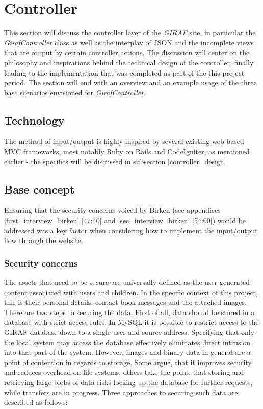 \section{Controller}
\label{controller}
This section will discuss the controller layer of the \emph{GIRAF} site, in particular the \emph{GirafController} class as well as the interplay of JSON and the incomplete views that are output by certain controller actions. The discussion will center on the philosophy and inspirations behind the technical design of the controller, finally leading to the implementation that was completed as part of the this project period. The section will end with an overview and an example usage of the three base scenarios envisioned for \emph{GirafController}.

\subsection{Technology}
The method of input/output is highly inspired by several existing web-based MVC frameworks, most notably Ruby on Rails and CodeIgniter, as mentioned earlier - the specifics will be discussed in subsection \vref{controller_design}.

\subsection{Base concept}
Ensuring that the security concerns voiced by Birken (see appendices \vref{first_interview_birken} [47:40] and \vref{sec_interview_birken} [54:00]) would be addressed was a key factor when considering how to implement the input/output flow through the website.

\subsubsection*{Security concerns}
The assets that need to be secure are universally defined as the user-generated content associated with users and children. In the specific context of this project, this is their personal details, contact book messages and the attached images. There are two steps to securing the data. First of all, data should be stored in a database with strict access rules. In MySQL it is possible to restrict access to the GIRAF database down to a single user and source address. Specifying that only the local system may access the database effectively eliminates direct intrusion into that part of the system. However, images and binary data in general are a point of contention in regards to storage. Some argue, that it improves security and reduces overhead on file systems, others take the point, that storing and retrieving large blobs of data risks locking up the database for further requests, while transfers are in progress. Three approaches to securing such data are described as follows:

